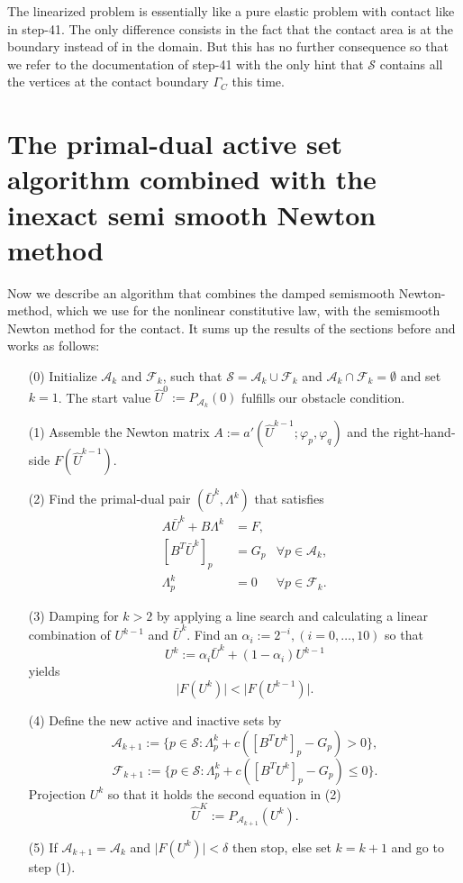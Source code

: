\documentclass{article}
\begin{document}
The linearized problem is essentially like a pure elastic problem with contact like
in step-41. The only difference consists in the fact that the contact area
is at the boundary instead of in the domain. But this has no further consequence
so that we refer to the documentation of step-41 with the only hint that
$\mathcal{S}$ contains all the vertices at the contact boundary $\Gamma_C$ this
time.

\section{The primal-dual active set algorithm combined with the inexact semi smooth
Newton method}

Now we describe an algorithm that combines the damped semismooth Newton-method,
which we use for the nonlinear constitutive law, with the semismooth Newton
method for the contact. It sums up the results of the sections before and works as follows:
\begin{itemize}
 \item[(0)] Initialize $\mathcal{A}_k$ and $\mathcal{F}_k$, such that
 $\mathcal{S} = \mathcal{A}_k \cup \mathcal{F}_k$ and $\mathcal{A}_k \cap
 \mathcal{F}_k = \emptyset$ and set $k = 1$. The start value $\hat U^0 :=
 P_{\mathcal{A}_k}(0)$ fulfills our obstacle condition.
 \item[(1)] Assemble the Newton matrix $A := a'(\hat
 U^{k-1};\varphi_p,\varphi_q)$ and the right-hand-side $F(\hat U^{k-1})$.
 \item[(2)] Find the primal-dual pair $(\bar U^k,\Lambda^k)$ that satisfies
 \begin{align*}
 A\bar U^k + B\Lambda^k & = F, &\\
 \left[B^T\bar U^k\right]_p & = G_p & \forall p\in\mathcal{A}_k,\\
 \Lambda^k_p & = 0 & \forall p\in\mathcal{F}_k.
 \end{align*}
 \item[(3)] Damping for $k>2$ by applying a line search and calculating a linear
 combination of $U^{k-1}$ and $\bar U^k$. Find an
 $\alpha_i:=2^{-i},(i=0,\ldots,10)$ so that $$U^k := \alpha_i\bar U^k +
 (1-\alpha_i)U^{k-1}$$ yields $$\vert
 F\left(U^{k}\right) \vert < \vert F\left(U^{k-1}\right) \vert.$$
 \item[(4)] Define the new active and inactive sets by
 $$\mathcal{A}_{k+1}:=\lbrace p\in\mathcal{S}:\Lambda^k_p +
 c\left(\left[B^TU^k\right]_p - G_p\right) > 0\rbrace,$$
 $$\mathcal{F}_{k+1}:=\lbrace p\in\mathcal{S}:\Lambda^k_p +
 c\left(\left[B^TU^k\right]_p - G_p\right) \leq 0\rbrace.$$
 Projection $U^k$ so that it holds the second equation in (2)
 $$\hat U^K := P_{\mathcal{A}_{k+1}}(U^k).$$
 \item[(5)] If $\mathcal{A}_{k+1} = \mathcal{A}_k$ and $\vert
 F\left(U^{k}\right) \vert < \delta$ then stop, else set $k=k+1$ and go to
 step (1).
\end{itemize}
\end{document}
